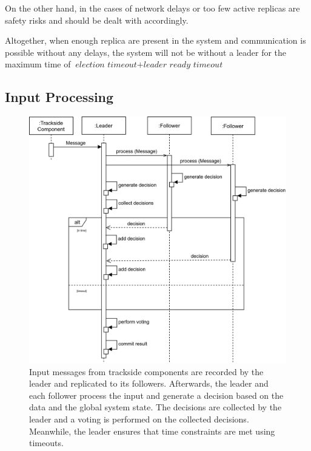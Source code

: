 On the other hand, in the cases of network delays or too few active replicas are safety risks and should be dealt with accordingly.

Altogether, when enough replica are present in the system and communication is possible without any delays, the system will not be without a leader for the maximum time of $\textit{election timeout} + \textit{leader ready timeout}$


\subsection{Input Processing}
\begin{figure}[!hb]
	\centering
	\includegraphics[width=0.75\linewidth]{images/sequence/CollectResults}
	\caption{Input messages from trackside components are recorded by the leader and replicated to its followers. Afterwards, the leader and each follower process the input and generate a decision based on the data and the global system state. The decisions are collected by the leader and a voting is performed on the collected decisions. Meanwhile, the leader ensures that time constraints are met using timeouts.}
	\label{fig:SeqCollectResults}
\end{figure}


